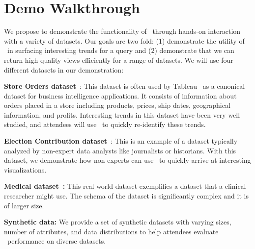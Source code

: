 \vspace{-2mm}
\section{Demo Walkthrough}
\label{sec:demo-walkthrough}
 
We propose to demonstrate the functionality of \SeeDB\ through hands-on
interaction with a variety of datasets. Our goals are two fold: (1) demonstrate
the utility of \SeeDB\ in surfacing interesting trends for a query
and (2) demonstrate that we can return high quality views efficiently for
a range of datasets. We will use four different datasets in our demonstration:

\begin{denselist}
  \item {\bf Store Orders dataset}~\cite{superstore}: This dataset is
    often used by Tableau~\cite{tableau} as a canonical dataset for
    business intelligence applications. It consists of information
    about orders placed in a store including products, prices, ship
    dates, geographical information, and profits. Interesting trends in
    this dataset have been very well studied, and attendees will use
    \SeeDB\ to quickly re-identify these trends. 
  \item {\bf Election Contribution dataset}~\cite{election_data}: This
  is an example of a dataset typically analyzed by
    non-expert data analysts like journalists or historians. With this
    dataset, we demonstrate how non-experts can use \SeeDB\ to quickly
    arrive at interesting visualizations.
  \item {\bf Medical dataset~\cite{mimic}:} This real-world dataset exemplifies
  a dataset that a clinical researcher might use. The schema of the dataset is
  significantly complex and it is of larger size.  
    \item {\bf Synthetic data:} We provide a set of synthetic datasets with
    varying sizes, number of attributes, and data distributions to help
    attendees evaluate \SeeDB\ performance on diverse datasets.
\end{denselist}

